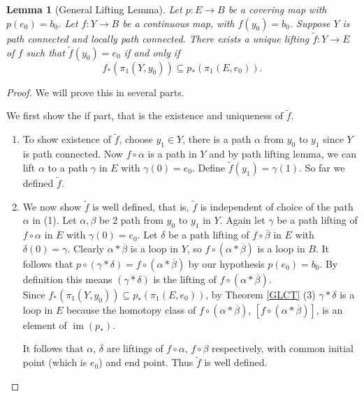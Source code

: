\documentclass{amsart}
\newtheorem{lemma}[theorem]{Lemma}
\theoremstyle{definition}
\theoremstyle{remark}
\numberwithin{equation}{section}
\begin{document}
\begin{lemma}[General Lifting Lemma] \label{GLL}Let $p : E \to B$ be a covering map with $p(e_0) = b_0$. Let $f : Y \to B$ be a continuous map, with $f(y_0) = b_0$. Suppose $Y$ is path connected and locally path connected. There exists a unique lifting $\tilde{f} : Y \to E$ of $f$ such that $\tilde{f}(y_0) = e_0$ if and only if
\[
f_\ast(\pi_1(Y, y_0)) \subseteq p_\ast(\pi_1(E, e_0)).
\]    
\end{lemma}
\begin{proof}
    \noindent We will prove this in several parts.

    \noindent We first show the if part, that is the existence and uniqueness of $\tilde{f}$.

    \begin{enumerate}
        \item To show existence of $\tilde{f}$, choose $y_1 \in Y$, there is a path $\alpha$ from $y_0$ to $y_1$ since $Y$ is path connected. Now $f \circ \alpha$ is a path in $Y$ and by path lifting lemma, we can lift $\alpha$ to a path $\gamma$ in $E$ with $\gamma(0) = e_0$. Define $\tilde{f}(y_1) = \gamma(1)$. So far we defined $\tilde{f}.$

        \item We now show $\tilde{f}$ is well defined, that is, $\tilde{f}$ is independent of choice of the path $\alpha$ in (1). Let $\alpha, \beta$ be 2 path from $y_0$ to $y_1$ in $Y$. Again let $\gamma$ be a path lifting of $f \circ \alpha$ in $E$ with $\gamma(0) = e_0$. Let $\delta$ be a path lifting of $f \circ \overline{\beta}$ in $E$ with $\delta(0) = \gamma$. Clearly $\alpha \ast \overline{\beta}$ is a loop in $Y$, so $f \circ (\alpha \ast \overline{\beta})$ is a loop in $B$. It follows that $p \circ (\gamma \ast \delta) = f \circ (\alpha \ast \overline{\beta})$ by our hypothesis $p(e_0) = b_0$. By definition this means $(\gamma \ast \delta)$ is the lifting of $f \circ (\alpha \ast \overline{\beta})$.\vspace{1em}\\
        Since $f_\ast(\pi_1(Y, y_0)) \subseteq p_\ast(\pi_1(E, e_0))$, by Theorem \ref{GLCT} (3) $\gamma \ast \delta$ is a loop in $E$ because the homotopy class of $f \circ (\alpha \ast \overline{\beta})$, $[f \circ (\alpha \ast \overline{\beta})]$, is an element of $\operatorname{im}(p_\ast)$.

        It follows that $\alpha$, $\overline{\delta}$ are liftings of $f \circ \alpha$, $f \circ \beta$ respectively, with common initial point (which is $e_0$) and end point. Thus $\tilde{f}$ is well defined.


\end{enumerate}
\end{proof}
\end{document}
